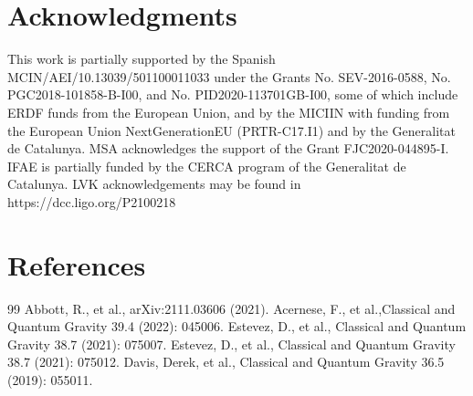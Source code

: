 \documentclass{moriond}
\begin{document}
\section*{Acknowledgments}

This work is partially supported by the Spanish MCIN/AEI/10.13039/501100011033 under the Grants No. SEV-2016-0588, No. PGC2018-101858-B-I00, and No. PID2020-113701GB-I00, some of which include ERDF funds from the European Union, and by the MICIIN with funding from the European Union NextGenerationEU (PRTR-C17.I1) and by the Generalitat de Catalunya. MSA acknowledges the support of the Grant FJC2020-044895-I. IFAE is partially funded by the CERCA program of the Generalitat de Catalunya. LVK acknowledgements may be found in https://dcc.ligo.org/P2100218

\section*{References}

\begin{thebibliography}{99}
 Abbott, R., et al., arXiv:2111.03606 (2021).
 Acernese, F., et al.,Classical and Quantum Gravity 39.4 (2022): 045006.
 Estevez, D., et al., Classical and Quantum Gravity 38.7 (2021): 075007.
 Estevez, D., et al., Classical and Quantum Gravity 38.7 (2021): 075012.
 Davis, Derek, et al., Classical and Quantum Gravity 36.5 (2019): 055011.

\end{thebibliography}
\end{document}
